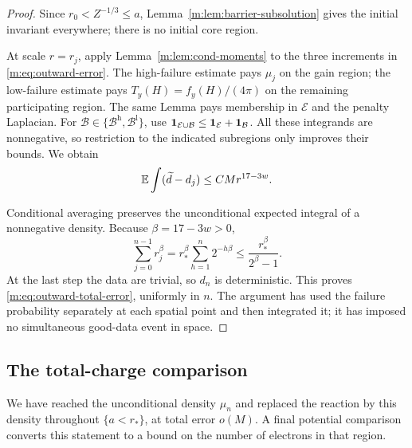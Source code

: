 \begin{proof}
Since $r_0<Z^{-1/3}\le a$, Lemma~\ref{m:lem:barrier-subsolution} gives the
initial invariant everywhere; there is no initial core region.

At scale $r=r_j$, apply Lemma~\ref{m:lem:cond-moments} to the three
increments in \eqref{m:eq:outward-error}.  The high-failure estimate pays
$\mu_j$ on the gain region; the low-failure estimate pays
$T_y(H)=f_y(H)/(4\pi)$ on the remaining participating region.
The same Lemma pays membership in $\mathcal E$ and the penalty
Laplacian. For $\mathcal B\in\{\mathcal B^{\mathrm h},\mathcal B^{\mathrm l}\}$,
use $\mathbf 1_{\mathcal E\cup\mathcal B}\le\mathbf 1_{\mathcal E}+\mathbf 1_{\mathcal B}$.
All these integrands are nonnegative, so restriction to
the indicated subregions only improves their bounds.  We obtain
\[
 \mathbb E\int(\widetilde d-d_j)\le C M r^{17-3w}.
\]

Conditional averaging preserves the unconditional expected integral of a
nonnegative density.  Because $\beta=17-3w>0$,
\[
 \sum_{j=0}^{n-1}r_j^\beta
   =r_*^\beta\sum_{h=1}^{n}2^{-h\beta}
   \le\frac{r_*^\beta}{2^\beta-1}.
\]
At the last step the data are trivial, so $d_n$ is deterministic.  This
proves \eqref{m:eq:outward-total-error}, uniformly in $n$.  The argument has
used the failure probability separately at each spatial point and then
integrated it; it has imposed no simultaneous good-data event in space.
\end{proof}

\subsection{The total-charge comparison}

We have reached the unconditional density $\mu_n$ and replaced the reaction
by this density throughout $\{a<r_*\}$, at total error $o(M)$.  A final
potential comparison converts this statement to a bound on the number of
electrons in that region.

